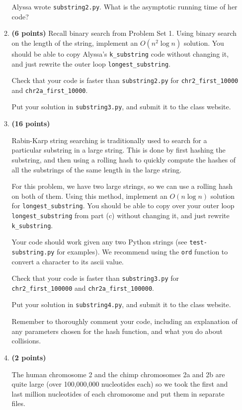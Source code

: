 \documentclass[12pt,twoside]{article}
\begin{document}
\begin{enumerate}
\begin{enumerate}
    Alyssa wrote \texttt{substring2.py}. What is the asymptotic
    running time of her code?

  \item {\bf (6 points)} Recall binary search from Problem Set 1.
    Using binary search on the length of the string, implement an
    $O(n^2 \log n)$ solution. You should be able to copy Alyssa's
    \texttt{k\_substring} code without changing it, and just rewrite
    the outer loop \texttt{longest\_substring}.
    
    Check that your code is faster than \texttt{substring2.py} for
    \texttt{chr2\_first\_10000} and \texttt{chr2a\_first\_10000}.

    Put your solution in \texttt{substring3.py}, and submit it to the
    class website.

  \item {\bf (16 points)} 

    Rabin-Karp string searching is traditionally used to search for a
    particular substring in a large string. This is done by first
    hashing the substring, and then using a rolling hash to quickly
    compute the hashes of all the substrings of the same length in the
    large string.

    For this problem, we have two large strings, so we can use a
    rolling hash on both of them. Using this method, implement an $O(n
    \log {n})$ solution for \texttt{longest\_substring}. You should be
    able to copy over your outer loop \texttt{longest\_substring} from
    part (c) without changing it, and just rewrite
    \texttt{k\_substring}.

    Your code should work given any two Python strings (see
    \texttt{test-substring.py} for examples). We recommend using the
    \texttt{ord} function to convert a character to its ascii value.

    Check that your code is faster than \texttt{substring3.py} for
    \texttt{chr2\_first\_100000} and \texttt{chr2a\_first\_100000}.

    Put your solution in \texttt{substring4.py}, and submit it to the
    class website.

    Remember to thoroughly comment your code, including an explanation
    of any parameters chosen for the hash function, and what you do
    about collisions.

  \item {\bf (2 points)} 

    The human chromosome 2 and the chimp chromosomes 2a and 2b are quite
    large (over 100,000,000 nucleotides each) so we took the first and
    last million nucleotides of each chromosome and put them in separate
    files.
    

\end{enumerate}
\end{enumerate}
\end{document}
